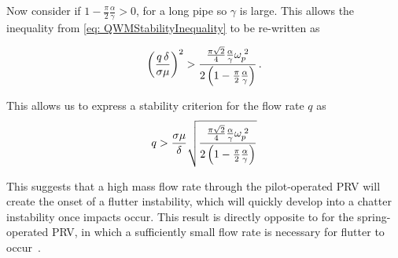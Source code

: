 Now consider if $1 - \frac{\pi}{2} \frac{\alpha}{\gamma} > 0$, for a long pipe so $\gamma$ is large. This allows the inequality from \cref{eq: QWMStabilityInequality} to be re-written as

\begin{equation*}
    \left( \frac{q \, \delta}{\sigma \mu} \right)^2 > \frac{\frac{\pi \sqrt{2}}{4} \frac{\alpha}{\gamma} \omega_p^{\;2}}{2 \left( 1 - \frac{\pi}{2}\frac{\alpha}{\gamma}\right)} \, .
\end{equation*}

This allows us to express a stability criterion for the flow rate $q$ as
~
\begin{equation*}
    q > \frac{\sigma \mu}{\delta} \sqrt{\frac{\frac{\pi \sqrt{2}}{4}\frac{\alpha}{\gamma}\omega_p^{\;2}}{2 \left( 1 - \frac{\pi}{2}\frac{\alpha}{\gamma}\right) }}
\end{equation*}

This suggests that a high mass flow rate through the pilot-operated PRV will create the onset of a flutter instability, which will quickly develop into a chatter instability once impacts occur. This result is directly opposite to for the spring-operated PRV, in which a sufficiently small flow rate is necessary for flutter to occur~\cite{Hos2015ModelPipe,Hos2016DynamicService}.


